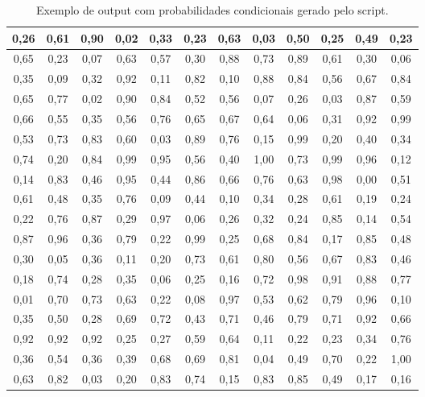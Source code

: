 \begin{table}[H]
\caption{Exemplo de output com probabilidades condicionais gerado pelo script.}
\label{q.output1}
\centering
\begin{tabular}{|c|c|c|c|c|c|c|c|c|c|c|c|}
\hline
0,26 & 0,61 & 0,90 & 0,02 & 0,33 & 0,23 & 0,63 & 0,03 & 0,50 & 0,25 & 0,49 & 0,23 \\ \hline
0,65 & 0,23 & 0,07 & 0,63 & 0,57 & 0,30 & 0,88 & 0,73 & 0,89 & 0,61 & 0,30 & 0,06 \\ \hline
0,35 & 0,09 & 0,32 & 0,92 & 0,11 & 0,82 & 0,10 & 0,88 & 0,84 & 0,56 & 0,67 & 0,84 \\ \hline
0,65 & 0,77 & 0,02 & 0,90 & 0,84 & 0,52 & 0,56 & 0,07 & 0,26 & 0,03 & 0,87 & 0,59 \\ \hline
0,66 & 0,55 & 0,35 & 0,56 & 0,76 & 0,65 & 0,67 & 0,64 & 0,06 & 0,31 & 0,92 & 0,99 \\ \hline
0,53 & 0,73 & 0,83 & 0,60 & 0,03 & 0,89 & 0,76 & 0,15 & 0,99 & 0,20 & 0,40 & 0,34 \\ \hline
0,74 & 0,20 & 0,84 & 0,99 & 0,95 & 0,56 & 0,40 & 1,00 & 0,73 & 0,99 & 0,96 & 0,12 \\ \hline
0,14 & 0,83 & 0,46 & 0,95 & 0,44 & 0,86 & 0,66 & 0,76 & 0,63 & 0,98 & 0,00 & 0,51 \\ \hline
0,61 & 0,48 & 0,35 & 0,76 & 0,09 & 0,44 & 0,10 & 0,34 & 0,28 & 0,61 & 0,19 & 0,24 \\ \hline
0,22 & 0,76 & 0,87 & 0,29 & 0,97 & 0,06 & 0,26 & 0,32 & 0,24 & 0,85 & 0,14 & 0,54 \\ \hline
0,87 & 0,96 & 0,36 & 0,79 & 0,22 & 0,99 & 0,25 & 0,68 & 0,84 & 0,17 & 0,85 & 0,48 \\ \hline
0,30 & 0,05 & 0,36 & 0,11 & 0,20 & 0,73 & 0,61 & 0,80 & 0,56 & 0,67 & 0,83 & 0,46 \\ \hline
0,18 & 0,74 & 0,28 & 0,35 & 0,06 & 0,25 & 0,16 & 0,72 & 0,98 & 0,91 & 0,88 & 0,77 \\ \hline
0,01 & 0,70 & 0,73 & 0,63 & 0,22 & 0,08 & 0,97 & 0,53 & 0,62 & 0,79 & 0,96 & 0,10 \\ \hline
0,35 & 0,50 & 0,28 & 0,69 & 0,72 & 0,43 & 0,71 & 0,46 & 0,79 & 0,71 & 0,92 & 0,66 \\ \hline
0,92 & 0,92 & 0,92 & 0,25 & 0,27 & 0,59 & 0,64 & 0,11 & 0,22 & 0,23 & 0,34 & 0,76 \\ \hline
0,36 & 0,54 & 0,36 & 0,39 & 0,68 & 0,69 & 0,81 & 0,04 & 0,49 & 0,70 & 0,22 & 1,00 \\ \hline
0,63 & 0,82 & 0,03 & 0,20 & 0,83 & 0,74 & 0,15 & 0,83 & 0,85 & 0,49 & 0,17 & 0,16 \\ \hline

\end{tabular}
\end{table}
